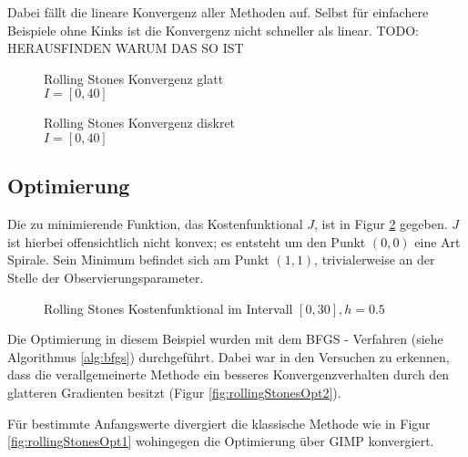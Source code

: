 Dabei fällt die lineare Konvergenz aller Methoden auf. Selbst für einfachere Beispiele ohne Kinks ist die Konvergenz nicht schneller als linear.
TODO: HERAUSFINDEN WARUM DAS SO IST


\begin{figure}[H]
\footnotesize 
\centering
\begin{minipage}[b]{0.49\linewidth}

\caption{Rolling Stones Konvergenz glatt\\ $I=[0,40]$}
\label{fig:rollingStonesAdjointSmooth}
\end{minipage}
\begin{minipage}[b]{0.49\linewidth}

\caption{Rolling Stones Konvergenz diskret\\ $I=[0,40]$}
\label{fig:rollingStonesAdjointDiscrete}
\end{minipage}
\end{figure}

\subsection{Optimierung}
Die zu minimierende Funktion, das Kostenfunktional $J$, ist in Figur \ref{fig:rolling_costfunctional} gegeben. $J$ ist hierbei offensichtlich nicht konvex; es entsteht um den Punkt $(0,0)$ eine Art Spirale. Sein Minimum befindet sich am Punkt $(1,1)$, trivialerweise an der Stelle der Observierungsparameter. 
\begin{figure}[H]
\centering

\caption{Rolling Stones Kostenfunktional im Intervall $[0,30],h=0.5$}
\label{fig:rolling_costfunctional}
\end{figure}

Die Optimierung in diesem Beispiel wurden mit dem BFGS - Verfahren (siehe Algorithmus \ref{alg:bfgs}) durchgeführt. Dabei war in den Versuchen zu erkennen, dass die verallgemeinerte Methode ein besseres Konvergenzverhalten durch den glatteren Gradienten besitzt (Figur \ref{fig:rollingStonesOpt2}).

Für bestimmte Anfangswerte divergiert die klassische Methode wie in Figur \ref{fig:rollingStonesOpt1} wohingegen die Optimierung über GIMP konvergiert. 

